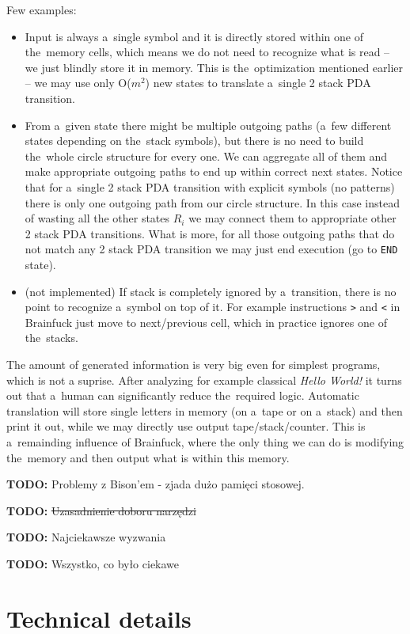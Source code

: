 \documentclass[english,shortabstract,mgr]{iithesis}
\newcommand{\todo}[1]{\textbf{TODO:} #1}
\begin{document}
Few examples:
\begin{itemize}
  \item Input is always a~single symbol and it is directly stored within one of the~memory cells,
      which means we do not need to recognize what is read -- we just blindly store it in memory.
      This is the~optimization mentioned earlier -- we may use only O($m^2$) new states to translate
      a~single 2 stack PDA transition.
  \item From a~given state there might be multiple outgoing paths (a~few different states depending
      on the~stack symbols), but there is no need to build the~whole circle structure for every one.
      We can aggregate all of them and make appropriate outgoing paths to end up within correct
      next states. Notice that for a~single 2 stack PDA transition with explicit symbols (no patterns)
      there is only one outgoing path from our circle structure. In this case instead of wasting all
      the other states $R_i$ we may connect them to appropriate other 2 stack PDA transitions.
      What is more, for all those outgoing paths that do not match any 2 stack PDA transition
      we may just end execution (go to \texttt{END} state).
  \item (not implemented) If stack is completely ignored by a~transition, there is no point
      to recognize a~symbol on top of it. For example instructions \texttt{>} and \texttt{<}
      in Brainfuck just move to next/previous cell, which in practice ignores one of the~stacks.
\end{itemize}

The amount of generated information is very big even for simplest programs, which is not a suprise.
After analyzing for example classical \textit{Hello World!} it turns out that a~human can
significantly reduce the~required logic. Automatic translation will store single letters
in memory (on a~tape or on a~stack) and then print it out, while we may directly use output
tape/stack/counter. This is a~remainding influence of Brainfuck, where the only thing we can do
is modifying the~memory and then output what is within this memory.

\todo{Problemy z Bison'em - zjada dużo pamięci stosowej.}

\todo{\sout{Uzasadnienie doboru narzędzi}}

\todo{Najciekawsze wyzwania}

\todo{Wszystko, co było ciekawe}

\section{Technical details}
\end{document}
